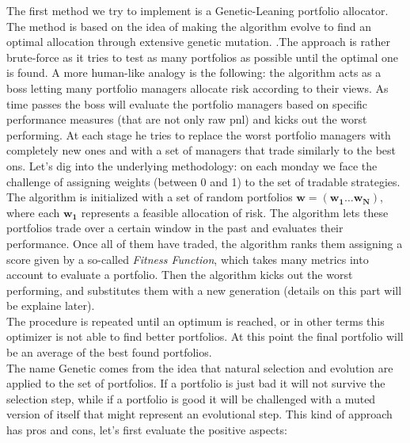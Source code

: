 \documentclass[a4paper]{article}
\numberwithin{equation}{subsection}
\begin{document}
The first method we try to implement is a Genetic-Leaning portfolio allocator. The method is based on the idea of making the algorithm evolve to find an optimal allocation through extensive genetic mutation. .The approach is rather brute-force as it tries to test as many portfolios as possible until the optimal one is found. A more human-like analogy is the following: the algorithm acts as a boss letting many portfolio managers allocate risk according to their views. As time passes the boss will evaluate the portfolio managers based on specific performance measures (that are not only raw pnl) and kicks out the worst performing. At each stage he tries to replace the worst portfolio managers with completely new ones and with a set of managers that trade similarly to the best ons. Let's dig into the underlying methodology: on each monday we face the challenge of assigning weights (between 0 and 1) to the set of tradable strategies. The algorithm is initialized  with a set of random portfolios $\mathbf{w} = (\mathbf{w_1} \dots \mathbf{w_N})$, where each $\mathbf{w_1}$ represents a feasible allocation of risk. The algorithm lets these portfolios trade over a certain window in the past and evaluates their performance. Once all of them have traded, the algorithm ranks them assigning a score given by a so-called \textit{Fitness Function}, which takes many metrics into account to evaluate a portfolio. Then the algorithm kicks out the worst performing, and substitutes them with a new generation (details on this part will be explaine later).\\ The procedure is repeated until an optimum is reached, or in other terms this optimizer is not able to find better portfolios. At this point the final portfolio will be an average of the best found portfolios.\\
The name Genetic comes from the idea that natural selection and evolution are applied to the set of portfolios. If a portfolio is just bad it will not survive the selection step, while if a portfolio is good it will be challenged with a muted version of itself that might represent an evolutional step. This kind of approach has pros and cons, let's first evaluate the positive aspects:
\end{document}

